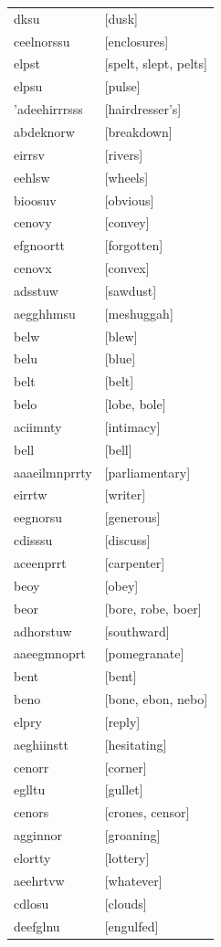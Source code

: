 \documentclass{article}
\begin{document}
\begin{tabular}{ll}
dksu & [dusk] \\
ceelnorssu & [enclosures] \\
elpst & [spelt, slept, pelts] \\
elpsu & [pulse] \\
'adeehirrrsss & [hairdresser's] \\
abdeknorw & [breakdown] \\
eirrsv & [rivers] \\
eehlsw & [wheels] \\
bioosuv & [obvious] \\
cenovy & [convey] \\
efgnoortt & [forgotten] \\
cenovx & [convex] \\
adsstuw & [sawdust] \\
aegghhmsu & [meshuggah] \\
belw & [blew] \\
belu & [blue] \\
belt & [belt] \\
belo & [lobe, bole] \\
aciimnty & [intimacy] \\
bell & [bell] \\
aaaeilmnprrty & [parliamentary] \\
eirrtw & [writer] \\
eegnorsu & [generous] \\
cdisssu & [discuss] \\
aceenprrt & [carpenter] \\
beoy & [obey] \\
beor & [bore, robe, boer] \\
adhorstuw & [southward] \\
aaeegmnoprt & [pomegranate] \\
bent & [bent] \\
beno & [bone, ebon, nebo] \\
elpry & [reply] \\
aeghiinstt & [hesitating] \\
cenorr & [corner] \\
eglltu & [gullet] \\
cenors & [crones, censor] \\
agginnor & [groaning] \\
elortty & [lottery] \\
aeehrtvw & [whatever] \\
cdlosu & [clouds] \\
deefglnu & [engulfed] \\

\end{tabular}
\end{document}
